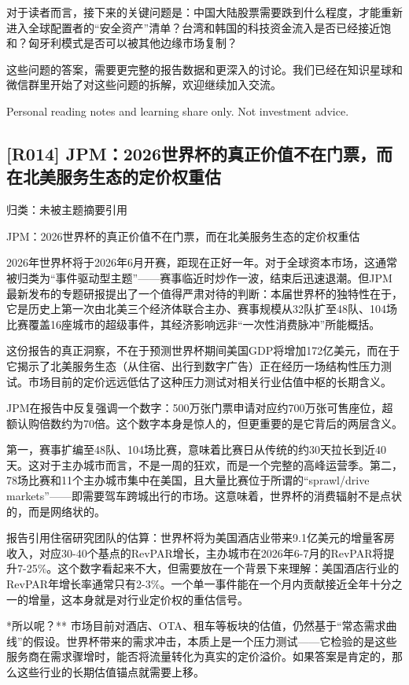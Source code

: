 \documentclass[11pt]{ctexart}
\begin{document}
对于读者而言，接下来的关键问题是：中国大陆股票需要跌到什么程度，才能重新进入全球配置者的“安全资产”清单？台湾和韩国的科技资金流入是否已经接近饱和？匈牙利模式是否可以被其他边缘市场复制？

这些问题的答案，需要更完整的报告数据和更深入的讨论。我们已经在知识星球和微信群里开始了对这些问题的拆解，欢迎继续加入交流。

Personal reading notes and learning share only. Not investment advice.

\subsection{[R014] JPM：2026世界杯的真正价值不在门票，而在北美服务生态的定价权重估}
{\small\color{refgray}归类：未被主题摘要引用}

JPM：2026世界杯的真正价值不在门票，而在北美服务生态的定价权重估

2026年世界杯将于2026年6月开赛，距现在正好一年。对于全球资本市场，这通常被归类为“事件驱动型主题”——赛事临近时炒作一波，结束后迅速退潮。但JPM最新发布的专题研报提出了一个值得严肃对待的判断：本届世界杯的独特性在于，它是历史上第一次由北美三个经济体联合主办、赛事规模从32队扩至48队、104场比赛覆盖16座城市的超级事件，其经济影响远非“一次性消费脉冲”所能概括。

这份报告的真正洞察，不在于预测世界杯期间美国GDP将增加172亿美元，而在于它揭示了北美服务生态（从住宿、出行到数字广告）正在经历一场结构性压力测试。市场目前的定价远远低估了这种压力测试对相关行业估值中枢的长期含义。

JPM在报告中反复强调一个数字：500万张门票申请对应约700万张可售座位，超额认购倍数约为70倍。这个数字本身是惊人的，但更重要的是它背后的两层含义。

第一，赛事扩编至48队、104场比赛，意味着比赛日从传统的约30天拉长到近40天。这对于主办城市而言，不是一周的狂欢，而是一个完整的高峰运营季。第二，78场比赛和11个主办城市集中在美国，且大量比赛位于所谓的“sprawl/drive markets”——即需要驾车跨城出行的市场。这意味着，世界杯的消费辐射不是点状的，而是网络状的。

报告引用住宿研究团队的估算：世界杯将为美国酒店业带来9.1亿美元的增量客房收入，对应30-40个基点的RevPAR增长，主办城市在2026年6-7月的RevPAR将提升7-25\%。这个数字看起来不大，但需要放在一个背景下来理解：美国酒店行业的RevPAR年增长率通常只有2-3\%。一个单一事件能在一个月内贡献接近全年十分之一的增量，这本身就是对行业定价权的重估信号。

*所以呢？** 市场目前对酒店、OTA、租车等板块的估值，仍然基于“常态需求曲线”的假设。世界杯带来的需求冲击，本质上是一个压力测试——它检验的是这些服务商在需求骤增时，能否将流量转化为真实的定价溢价。如果答案是肯定的，那么这些行业的长期估值锚点就需要上移。
\end{document}
